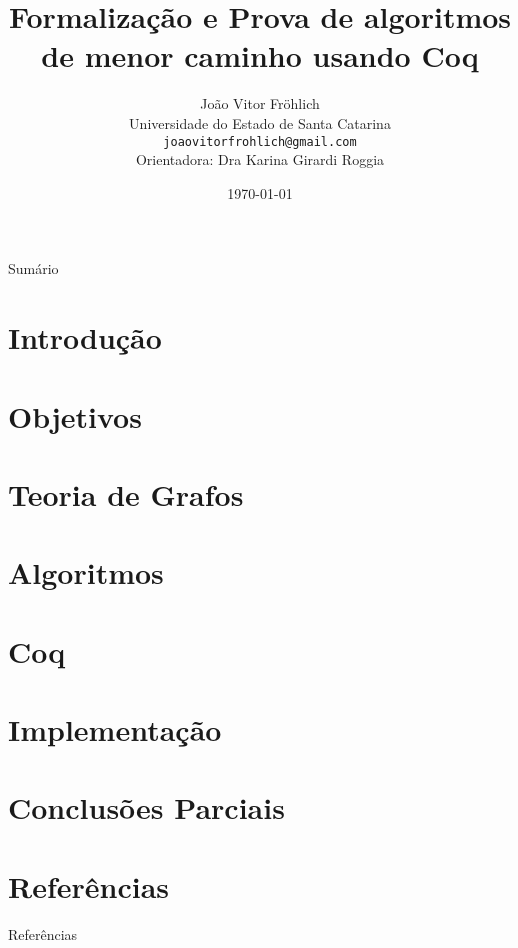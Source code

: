 \documentclass[xcolor=table]{beamer}
\title[]{Formalização e Prova de algoritmos de menor caminho usando Coq}
\author[João Vitor Fröhlich]{
    João Vitor Fröhlich\\\smallskip
    {\scriptsize Universidade do Estado de Santa Catarina \\\smallskip
    \vspace{-2mm}
    \texttt{joaovitorfrohlich@gmail.com}\\\medskip
    {Orientadora: Dra Karina Girardi Roggia}\\
    }
}
\date{\today}
\begin{document}
    \begin{frame}
        \titlepage
    \end{frame}

    \begin{frame}[allowframebreaks]{Sumário}
        \tableofcontents
    \end{frame}

    \section[]{Introdução}
    

    \section[]{Objetivos}
    
    


    \section[]{Teoria de Grafos}
    
    

    \section[]{Algoritmos}
    
    
    

    \section[]{Coq}
    
    

    \section[]{Implementação}
    

    \section[]{Conclusões Parciais}
    
    
    

    \section[]{Referências}
    \begin{frame}[allowframebreaks]{Referências}
        
    \end{frame}
\end{document}
